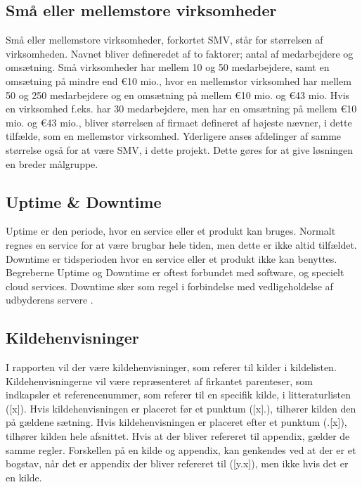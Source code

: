 \subsection{Små eller mellemstore virksomheder} \label{SMV} 
Små eller mellemstore virksomheder, forkortet SMV, står for størrelsen af virksomheden. Navnet bliver defineredet af to faktorer; antal af medarbejdere og omsætning. Små virksomheder har mellem 10 og 50 medarbejdere, samt en omsætning på mindre end \euro 10 mio., hvor en mellemstor virksomhed har mellem 50 og 250 medarbejdere og en omsætning på mellem \euro 10 mio. og \euro 43 mio. Hvis en virksomhed f.eks. har 30 medarbejdere, men har en omsætning på mellem \euro 10 mio. og \euro 43 mio., bliver størrelsen af firmaet defineret af højeste nævner, i dette tilfælde, som en mellemstor virksomhed.\citep{SMV} Yderligere anses afdelinger af samme størrelse også for at være SMV, i dette projekt. Dette gøres for at give løsningen en breder målgruppe.

\subsection{Uptime \& Downtime}
Uptime er den periode, hvor en service eller et produkt kan bruges. Normalt regnes en service for at være brugbar hele tiden, men dette er ikke altid tilfældet. Downtime er tidsperioden hvor en service eller et produkt ikke kan benyttes. Begreberne Uptime og Downtime er oftest forbundet med software, og specielt cloud services.\citep{drpbx_downtime, UpDown} Downtime sker som regel i forbindelse med vedligeholdelse af udbyderens servere \citep{drpbx_downtime}.

\subsection{Kildehenvisninger}
I rapporten vil der være kildehenvisninger, som referer til kilder i kildelisten. Kildehenvisningerne vil være repræsenteret af firkantet parenteser, som indkapsler et referencenummer, som referer til en specifik kilde, i litteraturlisten ([x]). Hvis kildehenvisningen er placeret før et punktum ([x].), tilhører kilden den på gældene sætning. Hvis kildehenvisningen er placeret efter et punktum (.[x]), tilhører kilden hele afsnittet. Hvis at der bliver refereret til appendix, gælder de samme regler. Forskellen på en kilde og appendix, kan genkendes ved at der er et bogstav, når det er appendix der bliver refereret til ([y.x]), men ikke hvis det er en kilde.
